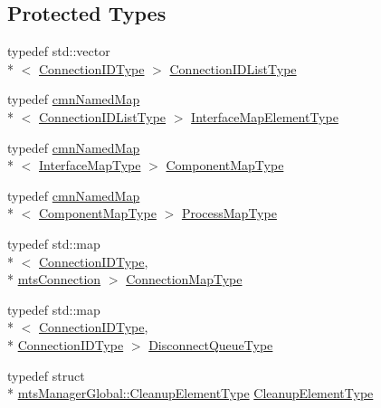 \subsection*{Protected Types}
\begin{DoxyCompactItemize}
\item 
typedef std\-::vector\\*
$<$ \hyperlink{mts_forward_declarations_8h_ad3543bb11742e1766374ec96016d6547}{Connection\-I\-D\-Type} $>$ \hyperlink{classmts_manager_global_a01bcfffc97f320cdd87425bd4bd5bbad}{Connection\-I\-D\-List\-Type}
\item 
typedef \hyperlink{classcmn_named_map}{cmn\-Named\-Map}\\*
$<$ \hyperlink{classmts_manager_global_a01bcfffc97f320cdd87425bd4bd5bbad}{Connection\-I\-D\-List\-Type} $>$ \hyperlink{classmts_manager_global_a3449158e2432ced5a21d4853a2ca59b6}{Interface\-Map\-Element\-Type}
\item 
typedef \hyperlink{classcmn_named_map}{cmn\-Named\-Map}\\*
$<$ \hyperlink{structmts_manager_global_1_1_interface_map_type}{Interface\-Map\-Type} $>$ \hyperlink{classmts_manager_global_ab954b59b5453e8c20301f3772bb1484f}{Component\-Map\-Type}
\item 
typedef \hyperlink{classcmn_named_map}{cmn\-Named\-Map}\\*
$<$ \hyperlink{classmts_manager_global_ab954b59b5453e8c20301f3772bb1484f}{Component\-Map\-Type} $>$ \hyperlink{classmts_manager_global_ab0257cb91cc9d4c59cf85706f65da9f1}{Process\-Map\-Type}
\item 
typedef std\-::map\\*
$<$ \hyperlink{mts_forward_declarations_8h_ad3543bb11742e1766374ec96016d6547}{Connection\-I\-D\-Type}, \\*
\hyperlink{classmts_connection}{mts\-Connection} $>$ \hyperlink{classmts_manager_global_abee7afe21ca1987b873dbfdc3ac2fbfb}{Connection\-Map\-Type}
\item 
typedef std\-::map\\*
$<$ \hyperlink{mts_forward_declarations_8h_ad3543bb11742e1766374ec96016d6547}{Connection\-I\-D\-Type}, \\*
\hyperlink{mts_forward_declarations_8h_ad3543bb11742e1766374ec96016d6547}{Connection\-I\-D\-Type} $>$ \hyperlink{classmts_manager_global_a2513c197a42becaff9d23272f4a7be4b}{Disconnect\-Queue\-Type}
\item 
typedef struct \\*
\hyperlink{structmts_manager_global_1_1_cleanup_element_type}{mts\-Manager\-Global\-::\-Cleanup\-Element\-Type} \hyperlink{classmts_manager_global_a52d8af643eef029ad83e5e430604261a}{Cleanup\-Element\-Type}

\end{DoxyCompactItemize}
